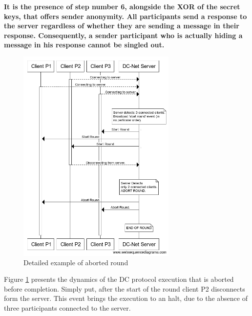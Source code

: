 \textbf{It is the presence of step number 6, alongside the XOR of the secret keys, that offers sender anonymity. All participants send a response to the server regardless of whether they are sending a message in their response. Consequently, a sender participant who is actually hiding a message in his response cannot be singled out.}

\begin{figure}[H]
    \centering
    \includegraphics[width=0.7\textwidth]{Images/Design/abortedRound.png}
    \caption{Detailed example of aborted round}
    \label{fig:abortedRound}
\end{figure}

Figure \ref{fig:abortedRound} presents the dynamics of the DC protocol execution that is aborted before completion. Simply put, after the start of the round client P2 disconnects form the server. This event brings the execution to an halt, due to the absence of three participants connected to the server. 


